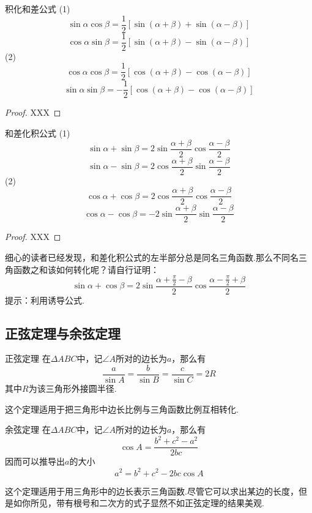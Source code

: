 \documentclass[lang=cn, zihao=4.5]{elegantbook}
\begin{document}
\begin{proposition}{积化和差公式} %
    (1)$$\sin{\alpha}\cos{\beta}=\frac{1}{2}[\sin{(\alpha+\beta)}+\sin{(\alpha-\beta)}]$$
    $$\cos{\alpha}\sin{\beta}=\frac{1}{2}[\sin{(\alpha+\beta)}-\sin{(\alpha-\beta)}]$$
    (2)$$\cos{\alpha}\cos{\beta}=\frac{1}{2}[\cos{(\alpha+\beta)}-\cos{(\alpha-\beta)}]$$
    $$\sin{\alpha}\sin{\beta}=-\frac{1}{2}[\cos{(\alpha+\beta)}-\cos{(\alpha-\beta)}]$$
\end{proposition}
\begin{proof}
    XXX
\end{proof}

\begin{proposition}{和差化积公式} %
    (1)$$\sin{\alpha}+\sin{\beta}=2\sin{\frac{\alpha+\beta}{2}}\cos{\frac{\alpha-\beta}{2}}$$
    $$\sin{\alpha}-\sin{\beta}=2\cos{\frac{\alpha+\beta}{2}}\sin{\frac{\alpha-\beta}{2}}$$
    (2)$$\cos{\alpha}+\cos{\beta}=2\cos{\frac{\alpha+\beta}{2}}\cos{\frac{\alpha-\beta}{2}}$$
    $$\cos{\alpha}-\cos{\beta}=-2\sin{\frac{\alpha+\beta}{2}}\sin{\frac{\alpha-\beta}{2}}$$
\end{proposition}
\begin{proof}
    XXX
\end{proof}
\begin{remark}
    细心的读者已经发现，和差化积公式的左半部分总是同名三角函数.那么不同名三角函数之和该如何转化呢？请自行证明：$$\sin{\alpha}+\cos{\beta}=2\sin{\frac{\alpha+\frac{\pi}{2}-\beta}{2}}\cos{\frac{\alpha-\frac{\pi}{2}+\beta}{2}}$$
    提示：利用诱导公式.
\end{remark}

\subsection{正弦定理与余弦定理}

\begin{theorem}{正弦定理} %
    在$\Delta ABC$中，记$\angle A$所对的边长为$a$，那么有$$\frac{a}{\sin{A}}=\frac{b}{\sin{B}}=\frac{c}{\sin{C}}=2R$$其中$R$为该三角形外接圆半径.
\end{theorem}
这个定理适用于把三角形中边长比例与三角函数比例互相转化.

\begin{theorem}{余弦定理} %
    在$\Delta ABC$中，记$\angle A$所对的边长为$a$，那么有$$\cos{A}=\frac{b^2+c^2-a^2}{2bc}$$
    因而可以推导出$a$的大小$$a^2=b^2+c^2-2bc \cos{A}$$
\end{theorem}
这个定理适用于用三角形中的边长表示三角函数.尽管它可以求出某边的长度，但是如你所见，带有根号和二次方的式子显然不如正弦定理的结果美观.
\end{document}
